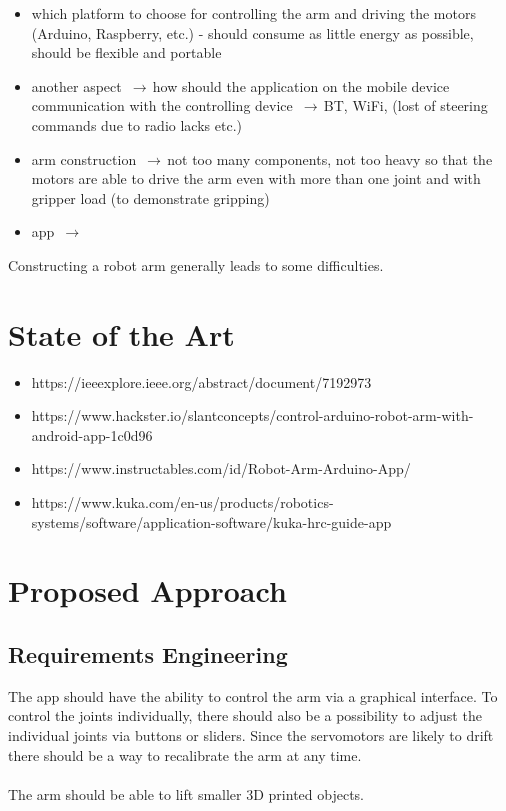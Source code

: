 \documentclass[conference]{IEEEtran}
\newcommand{\arrowright}{$\,\to\,$}
\begin{document}
\begin{itemize}
	\item which platform to choose for controlling the  arm and driving the motors (Arduino, Raspberry, etc.) - should consume as little energy as possible,  should be flexible and portable
	\item another aspect \arrowright how should the application on the mobile device communication with the controlling device \arrowright BT, WiFi, (lost of steering commands due to radio lacks etc.)
	\item arm construction \arrowright not too many components, not too heavy so that the motors are able to drive the arm even with more than one joint and with gripper load (to demonstrate gripping)
	\item app \arrowright 
\end{itemize}
Constructing a robot arm generally leads to some difficulties.

\section{State of the Art}

\begin{itemize}
	\item https://ieeexplore.ieee.org/abstract/document/7192973
	\item https://www.hackster.io/slantconcepts/control-arduino-robot-arm-with-android-app-1c0d96
	\item https://www.instructables.com/id/Robot-Arm-Arduino-App/
	\item https://www.kuka.com/en-us/products/robotics-systems/software/application-software/kuka-hrc-guide-app
\end{itemize}

\section{Proposed Approach}\label{sec:approach}

\subsection{Requirements Engineering}\label{sec:requirements}
The app should have the ability to control the arm via a graphical interface. To control the joints individually, there should also be a possibility to adjust the individual joints via buttons or sliders. Since the servomotors are likely to drift there should be a way to recalibrate the arm at any time.
\\\\
The arm should be able to lift smaller 3D printed objects.
\end{document}
